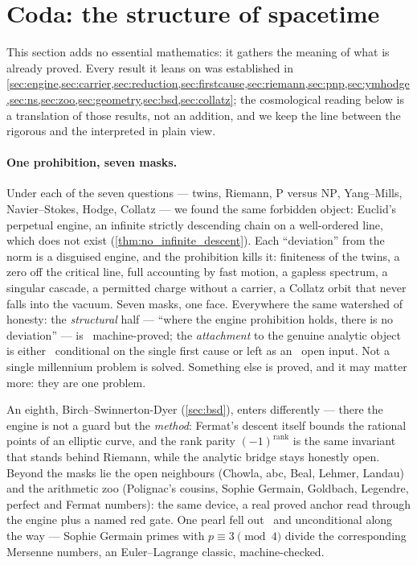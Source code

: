 \section{Coda: the structure of spacetime}\label{sec:coda}

This section adds no essential mathematics: it gathers the meaning of what is already proved. Every
result it leans on was established in \cref{sec:engine,sec:carrier,sec:reduction,sec:firstcause,sec:riemann,sec:pnp,sec:ymhodge,sec:ns,sec:zoo,sec:geometry,sec:bsd,sec:collatz}; the cosmological reading below is a
translation of those results, not an addition, and we keep the line between the rigorous and the
interpreted in plain view.

\paragraph{One prohibition, seven masks.}
Under each of the seven questions --- twins, Riemann, $\mathrm{P}$ versus $\mathrm{NP}$,
Yang--Mills, Navier--Stokes, Hodge, Collatz --- we found the same forbidden object: Euclid's
perpetual engine, an infinite strictly descending chain on a well-ordered line, which does not
exist (\cref{thm:no_infinite_descent}). Each ``deviation'' from the norm is a disguised engine, and
the prohibition kills it: finiteness of the twins, a zero off the critical line, full accounting by
fast motion, a gapless spectrum, a singular cascade, a permitted charge without a carrier, a
Collatz orbit that never falls into the vacuum. Seven masks, one face. Everywhere the same
watershed of honesty: the \emph{structural} half --- ``where the engine prohibition holds, there is
no deviation'' --- is \green{}~machine-proved; the \emph{attachment} to the genuine analytic object
is either \yellow{}~conditional on the single first cause \axiom{} or left as an \red{}~open input.
Not a single millennium problem is solved. Something else is proved, and it may matter more: they
are one problem.

An eighth, Birch--Swinnerton-Dyer (\cref{sec:bsd}), enters differently --- there the engine is not a
guard but the \emph{method}: Fermat's descent itself bounds the rational points of an elliptic
curve, and the rank parity $(-1)^{\mathrm{rank}}$ is the same invariant that stands behind Riemann,
while the analytic bridge stays honestly open. Beyond the masks lie the open neighbours (Chowla,
abc, Beal, Lehmer, Landau) and the arithmetic zoo (Polignac's cousins, Sophie Germain, Goldbach,
Legendre, perfect and Fermat numbers): the same device, a real proved anchor read through the
engine plus a named red gate. One pearl fell out \green{}~and unconditional along the way ---
Sophie Germain primes with $p \equiv 3 \pmod 4$ divide the corresponding Mersenne numbers, an
Euler--Lagrange classic, machine-checked.

